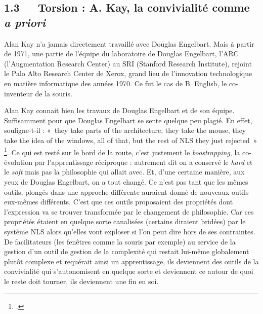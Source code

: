 \documentclass{FramateX}
\begin{document}
\begin{refsection}
\subsection*{1.3~~~Torsion : A. Kay, la convivialité comme \textit{a priori}}
{}

Alan Kay n'a jamais directement travaillé avec Douglas Engelbart. Mais à partir de 1971, une partie de l'équipe du laboratoire de Douglas Engelbart, l'ARC
(l'Augmentation Research Center) au SRI (Stanford Research Institute), 
rejoint le Palo Alto Research Center de Xerox, grand lieu de l'innovation technologique en matière
informatique des années 1970. Ce fut le cas de B. English, le co-inventeur de la
souris.

Alan Kay connait bien les travaux de Douglas Engelbart et de son
équipe. Suffisamment pour que Douglas Engelbart se sente quelque peu
plagié. En effet, souligne-t-il : «~they take parts of the architecture,
they take the mouse, they take the idea of the windows, all of that,
but the rest of NLS they just rejected~» \footnote{\cite[p.~154]{bardinibootstrapping2001}.}. Ce qui est
resté sur le bord de la route, c'est justement le \textit{boostrapping}, la
co-évolution par l'apprentissage réciproque : autrement dit on a
conservé le \textit{hard} et le \textit{soft} mais pas la philosophie qui allait avec.
Et, d'une certaine manière, aux yeux de Douglas Engelbart, on a tout
changé. Ce n'est pas tant que les mêmes outils, plongés dans une
approche différente auraient donné de nouveaux outils eux-mêmes
différents. C'est que ces outils proposaient des propriétés dont
l'expression va se trouver transformée par le changement de
philosophie. Car ces propriétés étaient en quelque sorte canalisées
(certains diraient bridées) par le système NLS alors qu'elles vont
exploser si l'on peut dire hors de ses contraintes. De facilitateurs
(les fenêtres comme la souris par exemple) au service de la gestion
d'un outil de gestion de la complexité qui restait lui-même globalement
plutôt complexe et requérait ainsi un apprentissage, ils deviennent des
outils de la convivialité qui s'autonomisent en quelque sorte et
deviennent ce autour de quoi le reste doit tourner, ils deviennent une
fin en soi.


\end{refsection}
\end{document}
